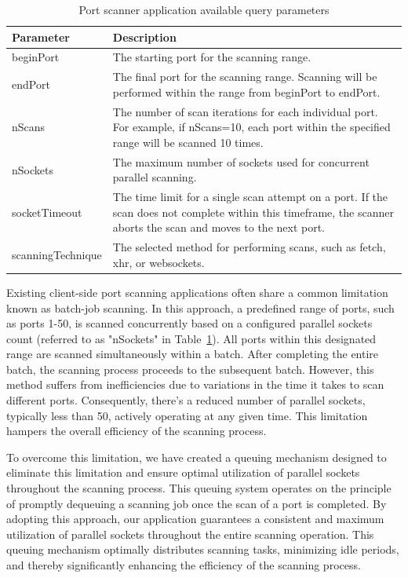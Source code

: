 \begin{table}[htbp]
\footnotesize
\centering
\begin{tabular}{p{3cm} p{10cm}}
    \toprule
    Parameter & Description \\
    \midrule
    beginPort & The starting port for the scanning range. \\
    endPort & The final port for the scanning range. Scanning will be performed within the range from beginPort to endPort. \\
    nScans & The number of scan iterations for each individual port. For example, if nScans=10, each port within the specified range will be scanned 10 times. \\
    nSockets & The maximum number of sockets used for concurrent parallel scanning. \\
    socketTimeout & The time limit for a single scan attempt on a port. If the scan does not complete within this timeframe, the scanner aborts the scan and moves to the next port. \\
    scanningTechnique & The selected method for performing scans, such as fetch, xhr, or websockets. \\
    \bottomrule
\end{tabular}
\caption{Port scanner application available query parameters}
\label{tab:port-scan-params}
\end{table}

Existing client-side port scanning applications often share a common limitation known as batch-job scanning. In this approach, a predefined range of ports, such as ports 1-50, is scanned concurrently based on a configured parallel sockets count (referred to as "nSockets" in Table~\ref{tab:port-scan-params}). All ports within this designated range are scanned simultaneously within a batch. After completing the entire batch, the scanning process proceeds to the subsequent batch. However, this method suffers from inefficiencies due to variations in the time it takes to scan different ports. Consequently, there's a reduced number of parallel sockets, typically less than 50, actively operating at any given time. This limitation hampers the overall efficiency of the scanning process.

To overcome this limitation, we have created a queuing mechanism designed to eliminate this limitation and ensure optimal utilization of parallel sockets throughout the scanning process. This queuing system operates on the principle of promptly dequeuing a scanning job once the scan of a port is completed. By adopting this approach, our application guarantees a consistent and maximum utilization of parallel sockets throughout the entire scanning operation. This queuing mechanism optimally distributes scanning tasks, minimizing idle periods, and thereby significantly enhancing the efficiency of the scanning process.

